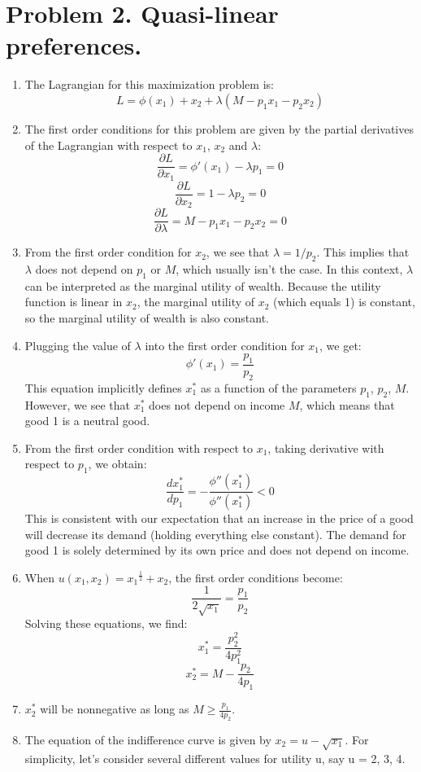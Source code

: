 \documentclass[UTF8,titlepage]{article}
\numberwithin{figure}{section}
\begin{document}
\section{Problem 2. Quasi-linear preferences.}
\begin{enumerate}
  \item The Lagrangian for this maximization problem is:
  \[L = \phi(x_1) + x_2 + \lambda(M - p_1x_1 - p_2x_2)\]
  \item The first order conditions for this problem are given by the partial derivatives of the Lagrangian with respect to $x_1$, $x_2$ and $\lambda$:
  \[\frac{\partial L}{\partial x_1} = \phi'(x_1) - \lambda p_1 = 0\]
  \[\frac{\partial L}{\partial x_2} = 1 - \lambda p_2 = 0\]
  \[\frac{\partial L}{\partial \lambda} = M - p_1 x_1 - p_2 x_2 = 0\]
  \item From the first order condition for $x_2$, we see that $\lambda = 1/p_2$. This implies that $\lambda$ does not depend on $p_1$ or $M$, which usually isn't the case. In this context, $\lambda$ can be interpreted as the marginal utility of wealth. Because the utility function is linear in $x_2$, the marginal utility of $x_2$ (which equals 1) is constant, so the marginal utility of wealth is also constant.
  \item Plugging the value of $\lambda$ into the first order condition for $x_1$, we get:
  \[\phi'(x_1) = \frac{p_1}{p_2}\]
  This equation implicitly defines $x_1^*$ as a function of the parameters $p_1$, $p_2$, $M$. However, we see that $x_1^*$ does not depend on income $M$, which means that good 1 is a neutral good.
  \item From the first order condition with respect to $x_1$, taking derivative with respect to $p_1$, we obtain:
  \[\frac{d x_1^*}{dp_1} = -\frac{\phi''(x_1^*)}{\phi''(x_1^*)} < 0\]
  This is consistent with our expectation that an increase in the price of a good will decrease its demand (holding everything else constant). The demand for good 1 is solely determined by its own price and does not depend on income.
  \item When $u(x_1, x_2) = {x_1}^{\frac{1}{2}} + x_2$, the first order conditions become:
  \[\frac{1}{2\sqrt{x_1}} = \frac{p_1}{p_2}\]
  Solving these equations, we find:
  \[x_1^* = \frac{p_2^2}{4 p_1^2}\]
  \[x_2^* = M - \frac{p_2}{4 p_1}\]
  \item $x_2^*$ will be nonnegative as long as $M \geq \frac{p_1}{4 p_2}$.
  \item The equation of the indifference curve is given by $x_2 = u - \sqrt{x_1}$. For simplicity, let's consider several different values for utility u, say u = 2, 3, 4.
  

\end{enumerate}
\end{document}
